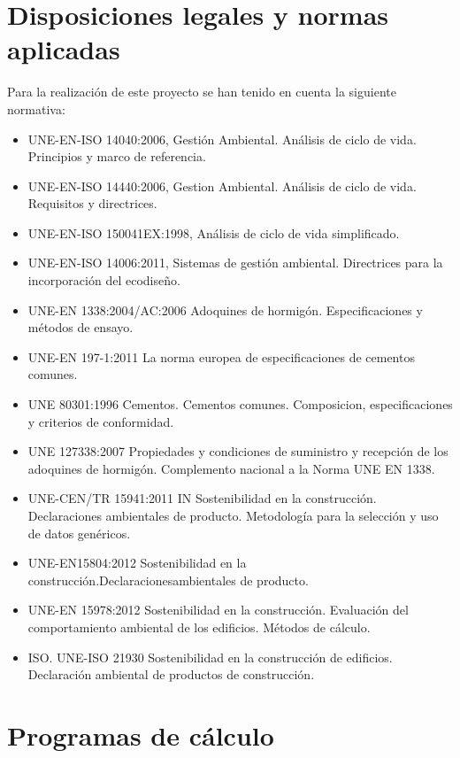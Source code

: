 \section{Disposiciones legales y normas aplicadas}

Para la realización de este proyecto se han tenido en cuenta la siguiente normativa:

\begin{itemize}
  \item UNE-EN-ISO 14040:2006, Gestión Ambiental. Análisis de ciclo de vida. Principios y marco de referencia.
  \item UNE-EN-ISO 14440:2006, Gestion Ambiental. Análisis de ciclo de vida. Requisitos y directrices.
  \item UNE-EN-ISO 150041EX:1998, Análisis de ciclo de vida simplificado.
  \item UNE-EN-ISO 14006:2011, Sistemas de gestión ambiental. Directrices para la incorporación del ecodiseño.
  \item UNE-EN 1338:2004/AC:2006 Adoquines de hormigón. Especificaciones y métodos de ensayo.
  \item UNE-EN 197-1:2011 La norma europea de especificaciones de cementos comunes.
  \item UNE 80301:1996 Cementos. Cementos comunes. Composicion, especificaciones y criterios de conformidad.
  \item UNE 127338:2007 Propiedades y condiciones de suministro y recepción de los adoquines de hormigón. Complemento nacional a la Norma UNE EN 1338.
  \item UNE-CEN/TR 15941:2011 IN Sostenibilidad en la construcción. Declaraciones ambientales de producto. Metodología para la selección y uso de datos genéricos.
  \item UNE-EN15804:2012 Sostenibilidad en la construcción.Declaracionesambientales de producto.
  \item UNE-EN 15978:2012 Sostenibilidad en la construcción. Evaluación del comportamiento ambiental de los edificios. Métodos de cálculo.
  \item ISO. UNE-ISO 21930 Sostenibilidad en la construcción de edificios. Declaración ambiental de productos de construcción.
\end{itemize}




\section{Programas de cálculo}

